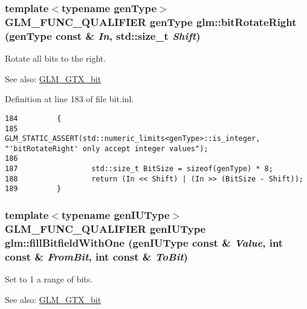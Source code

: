 \hypertarget{group__gtx__bit_g01a6893d9fa57a4df1f6f7b0d399268d}{
\subsubsection[bitRotateRight]{\setlength{\rightskip}{0pt plus 5cm}template$<$typename genType$>$ GLM\_\-FUNC\_\-QUALIFIER genType glm::bitRotateRight (genType const \& {\em In}, \/  std::size\_\-t {\em Shift})}}
\label{group__gtx__bit_g01a6893d9fa57a4df1f6f7b0d399268d}


Rotate all bits to the right. \begin{Desc}
\item[See also:]\hyperlink{group__gtx__bit}{GLM\_\-GTX\_\-bit} \end{Desc}


Definition at line 183 of file bit.inl.

\begin{Code}\begin{verbatim}184         {
185                 GLM_STATIC_ASSERT(std::numeric_limits<genType>::is_integer, "'bitRotateRight' only accept integer values");
186 
187                 std::size_t BitSize = sizeof(genType) * 8;
188                 return (In << Shift) | (In >> (BitSize - Shift));
189         }
\end{verbatim}
\end{Code}


\hypertarget{group__gtx__bit_g98140d04738cfe05d70f090a7f1151f9}{
\subsubsection[fillBitfieldWithOne]{\setlength{\rightskip}{0pt plus 5cm}template$<$typename genIUType$>$ GLM\_\-FUNC\_\-QUALIFIER genIUType glm::fillBitfieldWithOne (genIUType const \& {\em Value}, \/  int const \& {\em FromBit}, \/  int const \& {\em ToBit})}}
\label{group__gtx__bit_g98140d04738cfe05d70f090a7f1151f9}


Set to 1 a range of bits. \begin{Desc}
\item[See also:]\hyperlink{group__gtx__bit}{GLM\_\-GTX\_\-bit} \end{Desc}


